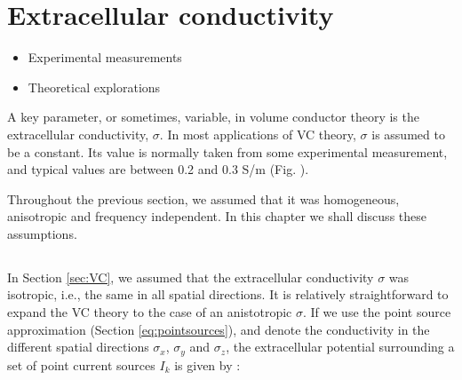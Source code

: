 \section{Extracellular conductivity}
\label{sec:Sigma}

\begin{itemize}
\item Experimental measurements \citep{Miceli2017}
\item Theoretical explorations \citep{Meffin2012,Tahayori2012,Meffin2014,Tahayori2014}
\end{itemize}



A key parameter, or sometimes, variable, in volume conductor theory is the extracellular conductivity, $\sigma$. In most applications of VC theory, $\sigma$ is assumed to be a constant. Its value is normally taken from some experimental measurement, and typical values are between 0.2 and 0.3 S/m (Fig. \label{Sigma:fig:freq_dep}). 

Throughout the previous section, we assumed that it was homogeneous, anisotropic and frequency independent. In this chapter we shall discuss these assumptions. 


\subsection{}
\label{sec:Anisotropic}
\subsubsection{ }
In Section \ref{sec:VC}, we assumed that the extracellular conductivity $\sigma$ was isotropic, i.e., the same in all spatial directions. It is relatively straightforward to expand the VC theory to the case of an anistotropic $\sigma$. If we use the point source approximation (Section \ref{eq:pointsources}), and denote the conductivity in the different spatial directions $\sigma_x$, $\sigma_y$ and $\sigma_z$, the extracellular potential surrounding a set of point current sources $I_k$ is given by \citep{nicholson1975, Pettersen2012}:


